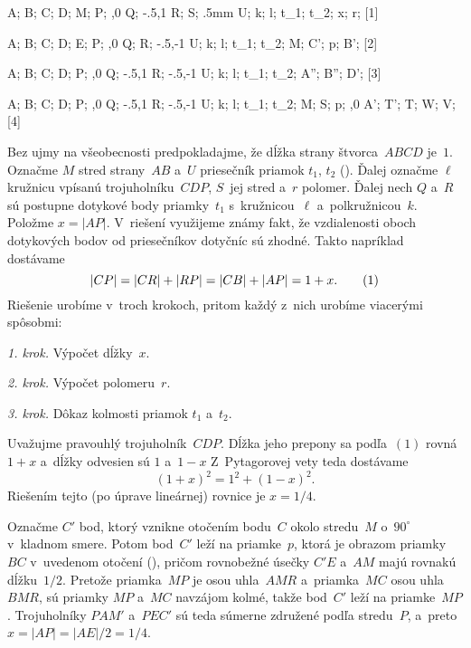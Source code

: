 {%
\fontplace
\tpoint A; \tpoint B; \bpoint C; \bpoint D;
\tpoint M;
\rpoint P; \rbpoint{},0 Q;
\ltpoint\xy-.5,1 R; \rpoint S;
\tpoint\down 1mm\toleft .5mm U;
\rpoint k; \lBpoint l;
\bpoint t_1; \bpoint\toright 1mm t_2;
\rpoint x; \lpoint r;
[1] \hfil\Obr

\fontplace
\tpoint A; \tpoint B; \bpoint C; \bpoint D;
\rbpoint E;
\rpoint\down 1mm P; \rbpoint{},0 Q;
\lpoint\toright 1mm R;
\tpoint\xy-.5,-1 U;
\rpoint k; \lBpoint l;
\bpoint t_1; \bpoint\toright 1mm t_2;
\tpoint M; \bpoint C';
\bpoint p; \ltpoint B';
[2] \hfil\Obr

\fontplace
\rtpoint A; \ltpoint B; \bpoint C; \bpoint D;
\rBpoint P; \rbpoint{},0 Q;
\ltpoint\xy-.5,1 R;
\tpoint\xy-.5,-1 U;
\rpoint k; \lBpoint l;
\bpoint t_1; \bpoint\toright 1mm t_2;
\tpoint A''; \tpoint B'';
\tpoint D';
[3] \hfil\Obr

\fontplace
\tpoint A; \tpoint B; \bpoint C; \bpoint D;
\rpoint P; \rbpoint{},0 Q;
\ltpoint\xy-.5,1 R;
\tpoint\xy-.5,-1 U;
\rpoint k; \lBpoint l;
\bpoint t_1; \bpoint\toright 1mm t_2;
\tpoint M; \bpoint S;
\bpoint p;
\bpoint{},0 A'; \lBpoint T'; \rpoint T; \bpoint{} W;
\bpoint{} V;
[4] \hfil\Obr

Bez ujmy na všeobecnosti predpokladajme, že dĺžka strany štvorca~$ABCD$
je~$1$. Označme $M$ stred strany~$AB$ a~$U$ priesečník priamok
$t_1$, $t_2$ (\obr). Ďalej označme $\ell$ kružnicu vpísanú
trojuholníku~$CDP$, $S$~jej stred a~$r$ polomer. Ďalej nech
$Q$ a~$R$ sú postupne dotykové body priamky~$t_1$ s~kružnicou~$\ell$
a~polkružnicou~$k$. Položme $x=|AP|$.
V~riešení využijeme známy fakt, že
vzdialenosti oboch dotykových bodov od priesečníkov dotyčníc sú zhodné. Takto
napríklad dostávame
$$
  |CP| = |CR| + |RP| = |CB| + |AP| = 1 + x .  \tag1
$$
Riešenie urobíme v~troch krokoch, pritom každý z~nich urobíme
viacerými spôsobmi:

{\it 1. krok.}
  Výpočet dĺžky~$x$.

{\it 2. krok.}
  Výpočet polomeru~$r$.

{\it 3. krok.}
  Dôkaz kolmosti priamok $t_1$ a~$t_2$.
\inspicture{}

\smallskip
{}
Uvažujme pravouhlý trojuholník~$CDP$. Dĺžka jeho prepony sa podľa~$(1)$
rovná $1+x$ a~dĺžky odvesien sú $1$ a~$1-x$
Z~Pytagorovej vety teda dostávame
$$
  (1+x)^2 = 1^2 + (1-x)^2.
$$
Riešením tejto (po úprave lineárnej) rovnice je $x=1/4$.

\inspicture{}
Označme $C'$ bod, ktorý vznikne otočením bodu~$C$ okolo stredu~$M$
o~$90^\circ$ v~kladnom smere. Potom bod~$C'$ leží na priamke~$p$,
ktorá je obrazom priamky~$BC$ v~uvedenom otočení (\obr),
pričom rovnobežné úsečky $C'E$ a~$AM$ majú rovnakú dĺžku~$1/2$.
Pretože priamka~$MP$ je osou uhla~$AMR$ a~priamka~$MC$
osou uhla~$BMR$, sú priamky $MP$ a~$MC$ navzájom kolmé, takže
bod~$C'$ leží na priamke~$MP$. Trojuholníky $PAM'$ a~$PEC'$ sú
teda súmerne združené podľa stredu~$P$, a~preto
$x=|AP|=|AE|/2=1/4$.

}
